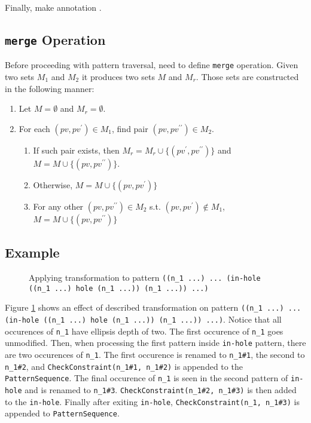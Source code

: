 Finally, make annotation .

\subsection{\texttt{merge} Operation}
Before proceeding with pattern traversal, need to define \texttt{merge} operation. Given two sets $M_1$ and $M_2$ it produces two sets $M$ and $M_r$. Those sets are constructed in the following manner:

\begin{enumerate}
\item Let $M=\emptyset$ and $M_r=\emptyset$.
\item For each $(pv, pv^{\prime}) \in M_1$, find pair $(pv, pv^{\prime\prime}) \in M_2$. 
\begin{enumerate}
\item If such pair exists, then $M_r=M_r \cup \{(pv^{\prime},  pv^{\prime\prime})\}$ and $M=M \cup \{(pv,  pv^{\prime\prime})\}$.
\item Otherwise, $M=M \cup \{(pv,  pv^{\prime})\}$
\item For any other $(pv, pv^{\prime\prime}) \in M_2$ s.t.  $(pv, pv^{\prime}) \notin M_1$, $M=M \cup \{(pv,  pv^{\prime\prime})\}$
\end{enumerate}
\end{enumerate}

\subsection{Example}

\begin{figure}[ht]
	\centering
\caption{Applying transformation to pattern \texttt{((n\_1 ...) ... (in-hole ((n\_1 ...) hole (n\_1 ...)) (n\_1 ...)) ...)}}
\label{transformation-pattern-constraintcheck}
\end{figure}

Figure \ref{transformation-pattern-constraintcheck} shows an effect of described transformation on pattern \texttt{((n\_1 ...) ... (in-hole ((n\_1 ...) hole (n\_1 ...)) (n\_1 ...)) ...)}. Notice that all occurences of \texttt{n\_1} have ellipsis depth of two. The first occurence of \texttt{n\_1} goes unmodified. Then, when processing the first pattern inside \texttt{in-hole} pattern, there are two occurences of \texttt{n\_1}. The first occurence is renamed to \texttt{n\_1\#1}, the second to \texttt{n\_1\#2}, and \texttt{CheckConstraint(n\_1\#1, n\_1\#2)} is appended to the \texttt{PatternSequence}. The final occurence of \texttt{n\_1} is seen in the second pattern of \texttt{in-hole} and is renamed to \texttt{n\_1\#3}. \texttt{CheckConstraint(n\_1\#2, n\_1\#3)} is then added to the \texttt{in-hole}. Finally after exiting \texttt{in-hole}, \texttt{CheckConstraint(n\_1, n\_1\#3)} is appended to \texttt{PatternSequence}.



